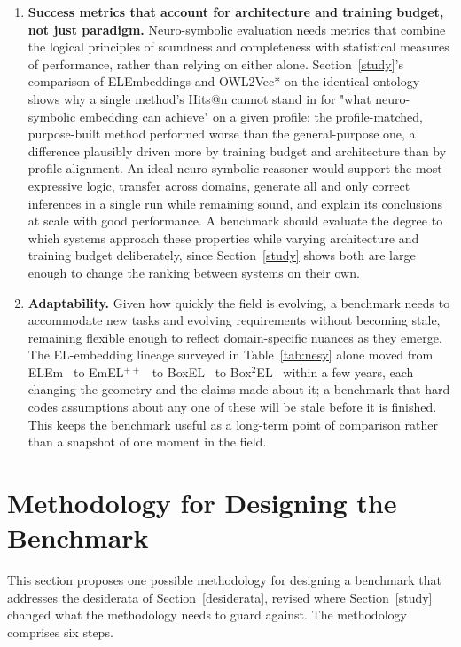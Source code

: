 \begin{enumerate}
    \item \textbf{Success metrics that account for architecture and training budget, not just paradigm.} Neuro-symbolic evaluation needs metrics that combine the logical principles of soundness and completeness with statistical measures of performance, rather than relying on either alone. Section~\ref{study}'s comparison of ELEmbeddings and OWL2Vec* on the identical ontology shows why a single method's Hits@n cannot stand in for "what neuro-symbolic embedding can achieve" on a given profile: the profile-matched, purpose-built method performed worse than the general-purpose one, a difference plausibly driven more by training budget and architecture than by profile alignment. An ideal neuro-symbolic reasoner would support the most expressive logic, transfer across domains, generate all and only correct inferences in a single run while remaining sound, and explain its conclusions at scale with good performance. A benchmark should evaluate the degree to which systems approach these properties while varying architecture and training budget deliberately, since Section~\ref{study} shows both are large enough to change the ranking between systems on their own.

    \item \textbf{Adaptability.} Given how quickly the field is evolving, a benchmark needs to accommodate new tasks and evolving requirements without becoming stale, remaining flexible enough to reflect domain-specific nuances as they emerge. The EL-embedding lineage surveyed in Table~\ref{tab:nesy} alone moved from ELEm~\cite{ELEm} to EmEL$^{++}$~\cite{Mondal} to BoxEL~\cite{faithful_embeddings} to Box$^2$EL~\cite{dualboxembeddings} within a few years, each changing the geometry and the claims made about it; a benchmark that hard-codes assumptions about any one of these will be stale before it is finished. This keeps the benchmark useful as a long-term point of comparison rather than a snapshot of one moment in the field.
\end{enumerate}

\section{Methodology for Designing the Benchmark}
\label{benchmark}

This section proposes one possible methodology for designing a benchmark that addresses the desiderata of Section~\ref{desiderata}, revised where Section~\ref{study} changed what the methodology needs to guard against. The methodology comprises six steps.

